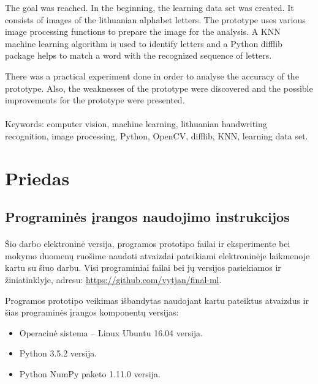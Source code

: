 \documentclass[a4paper,12pt]{article}
\begin{document}
The goal was reached. In the beginning, the learning data set was created. It consists of images of the lithuanian alphabet letters. The prototype uses various image processing functions to prepare the image for the analysis. A KNN machine learning algorithm is used to identify letters and a Python difflib package helps to match a word with the recognized sequence of letters. 

There was a practical experiment done in order to analyse the accuracy of the prototype. Also, the weaknesses of the prototype were discovered and the possible improvements for the prototype were presented.
\newline
\newline
\paragraph{}Keywords: computer vision, machine learning, lithuanian handwriting recognition, image processing, Python, OpenCV, difflib, KNN, learning data set.


\clearpage
\pagestyle{empty}
\appendix
{}
\section*{Priedas}
\subsection*{Programinės įrangos naudojimo instrukcijos}
\paragraph{} Šio darbo elektroninė versija, programos prototipo failai ir eksperimente bei mokymo duomenų ruošime naudoti atvaizdai pateikiami elektroninėje laikmenoje kartu su šiuo darbu. Visi programiniai failai bei jų versijos pasiekiamos ir žiniatinklyje, adresu: \newline
\url{https://github.com/vytjan/final-ml}.

Programos prototipo veikimas išbandytas naudojant kartu pateiktus atvaizdus ir šias programinės įrangos komponentų versijas:
\begin{itemize}
	\item Operacinė sistema – Linux Ubuntu 16.04 versija.
	\item Python 3.5.2 versija.
	\item Python NumPy paketo 1.11.0 versija.
\end{itemize}
\end{document}
